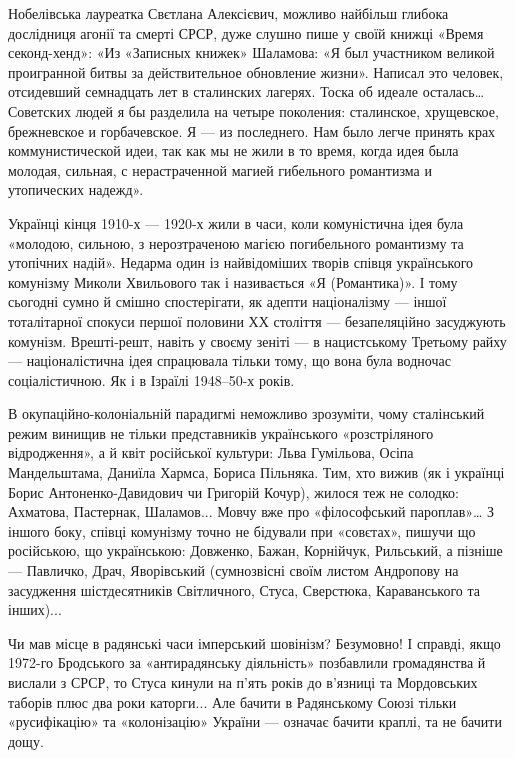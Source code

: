 Нобелівська лауреатка Свєтлана Алексієвич, можливо найбільш глибока дослідниця
агонії та смерті СРСР, дуже слушно пише у своїй книжці «Время секонд-хенд»: «Из
«Записных книжек» Шаламова: «Я был участником великой проигранной битвы за
действительное обновление жизни». Написал это человек, отсидевший семнадцать
лет в сталинских лагерях. Тоска об идеале осталась… Советских людей я бы
разделила на четыре поколения: сталинское, хрущевское, брежневское и
горбачевское. Я — из последнего. Нам было легче принять крах коммунистической
идеи, так как мы не жили в то время, когда идея была молодая, сильная, с
нерастраченной магией гибельного романтизма и утопических надежд».

Українці кінця 1910-х — 1920-х жили в часи, коли комуністична ідея була
«молодою, сильною, з нерозтраченою магією погибельного романтизму та утопічних
надій». Недарма один із найвідоміших творів співця українського комунізму
Миколи Хвильового так і називається «Я (Романтика)». І тому сьогодні сумно й
смішно спостерігати, як адепти націоналізму — іншої тоталітарної спокуси першої
половини ХХ століття — безапеляційно засуджують комунізм. Врешті-решт, навіть у
своєму зеніті — в нацистському Третьому райху — націоналістична ідея спрацювала
тільки тому, що вона була водночас соціалістичною. Як і в Ізраїлі 1948–50-х
років.

В окупаційно-колоніальній парадигмі неможливо зрозуміти, чому сталінський режим
винищив не тільки представників українського «розстріляного відродження», а й
квіт російської культури: Льва Гумільова, Осіпа Мандельштама, Даниїла Хармса,
Бориса Пільняка. Тим, хто вижив (як і українці Борис Антоненко-Давидович чи
Григорій Кочур), жилося теж не солодко: Ахматова, Пастернак, Шаламов... Мовчу
вже про «філософський пароплав»… З іншого боку, співці комунізму точно не
бідували при «совєтах», пишучи що російською, що українською: Довженко, Бажан,
Корнійчук, Рильський, а пізніше — Павличко, Драч, Яворівський (сумнозвісні
своїм листом Андропову на засудження шістдесятників Світличного, Стуса,
Сверстюка, Караванського та інших)... 

 
Чи мав місце в радянські часи імперський шовінізм? Безумовно! І справді, якщо
1972-го Бродського за «антирадянську діяльність» позбавлили громадянства й
вислали з СРСР, то Стуса кинули на п’ять років до в’язниці та Мордовських
таборів плюс два роки каторги... Але бачити в Радянському Союзі тільки
«русифікацію» та «колонізацію» України — означає бачити краплі, та не бачити
дощу. 

